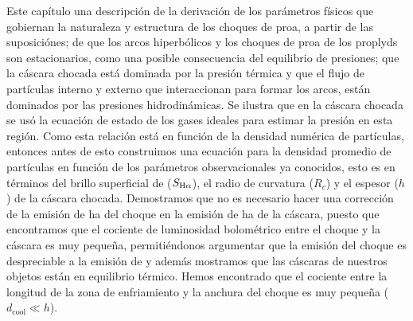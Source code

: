 % 



% 


\label{chap:theori}

Este capítulo  una descripción de la derivación de los parámetros físicos que gobiernan la naturaleza y estructura de los choques de proa, a partir de las suposiciónes; de que los arcos hiperbólicos y los choques de proa de los proplyds son estacionarios, como una posible consecuencia del equilibrio de presiones; que la cáscara chocada está dominada por la presión térmica y que el flujo de partículas interno y externo que interaccionan para formar los arcos, están dominados por las presiones hidrodinámicas. Se ilustra que en la cáscara chocada se usó la ecuación de estado de los gases ideales para estimar la presión en esta región. Como esta relación está en función de la densidad numérica de partículas, entonces antes de esto construimos una ecuación para la densidad promedio de partículas en función de los parámetros observacionales ya conocidos, esto es en términos del brillo superficial de \ha{} (\(S_{\mathrm{H}\alpha{}}\)), el radio de curvatura (\(R_{c}\)) y el espesor (\(h\)) de la cáscara chocada. Demostramos que no es necesario hacer una corrección de la emisión de ha{} del choque en la emisión de ha{} de la cáscara, puesto que encontramos que el cociente de luminosidad bolométrico entre el choque y la cáscara es muy pequeña, permitiéndonos argumentar que la emisión del choque es despreciable a la emisión de \ha{} y además mostramos que las cáscaras de nuestros objetos están en equilibrio térmico. Hemos encontrado que el cociente entre la longitud de la zona de enfriamiento y la anchura del choque es muy pequeña (\(d_{\text{cool}} \ll h\)).  \\ 


